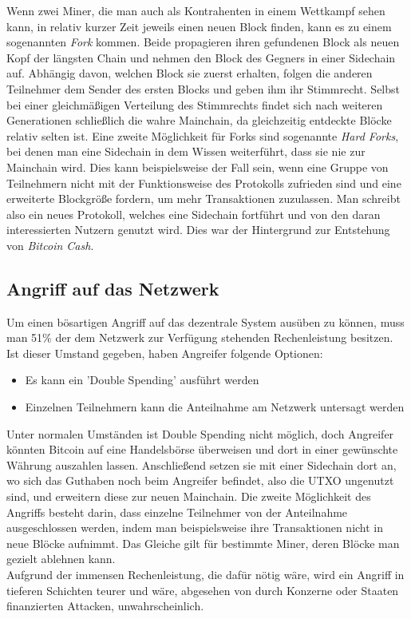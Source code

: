 Wenn zwei Miner, die man auch als Kontrahenten in einem Wettkampf sehen kann, in relativ kurzer Zeit jeweils einen neuen Block finden, kann es zu einem sogenannten \emph{Fork} kommen. 
Beide propagieren ihren gefundenen Block als neuen Kopf der längsten Chain und nehmen den Block des Gegners in einer Sidechain auf. Abhängig davon, welchen Block sie zuerst erhalten, folgen die anderen Teilnehmer dem Sender des ersten Blocks und geben ihm ihr Stimmrecht. 
Selbst bei einer gleichmäßigen Verteilung des Stimmrechts findet sich nach weiteren Generationen schließlich die wahre Mainchain, da gleichzeitig entdeckte Blöcke relativ selten ist.
Eine zweite Möglichkeit für Forks sind sogenannte \emph{Hard Forks}, bei denen man eine Sidechain in dem Wissen weiterführt, dass sie nie zur Mainchain wird. Dies kann beispielsweise der Fall sein, wenn eine Gruppe von Teilnehmern nicht mit der Funktionsweise des Protokolls zufrieden sind und eine erweiterte Blockgröße fordern, um mehr Transaktionen zuzulassen. Man schreibt also ein neues Protokoll, welches eine Sidechain fortführt und von den daran interessierten Nutzern genutzt wird. Dies war der Hintergrund zur Entstehung von \emph{Bitcoin Cash}.
\subsection{Angriff auf das Netzwerk}
Um einen bösartigen Angriff auf das dezentrale System ausüben zu können, muss man 51\% der dem Netzwerk zur Verfügung stehenden Rechenleistung besitzen. Ist dieser Umstand gegeben, haben Angreifer folgende Optionen:
\begin{itemize}
	\item Es kann ein 'Double Spending' ausführt werden
	\item Einzelnen Teilnehmern kann die Anteilnahme am Netzwerk untersagt werden
\end{itemize}
Unter normalen Umständen ist Double Spending nicht möglich, doch Angreifer könnten Bitcoin auf eine Handelsbörse überweisen und dort in einer gewünschte Währung auszahlen lassen. Anschließend setzen sie mit einer Sidechain dort an, wo sich das Guthaben noch beim Angreifer befindet, also die UTXO ungenutzt sind, und erweitern diese zur neuen Mainchain.
Die zweite Möglichkeit des Angriffs besteht darin, dass einzelne Teilnehmer von der Anteilnahme ausgeschlossen werden, indem man beispielsweise ihre Transaktionen nicht in neue Blöcke aufnimmt. Das Gleiche gilt für bestimmte Miner, deren Blöcke man gezielt ablehnen kann.\\

Aufgrund der immensen Rechenleistung, die dafür nötig wäre, wird ein Angriff in tieferen Schichten teurer und wäre, abgesehen von durch Konzerne oder Staaten finanzierten Attacken, unwahrscheinlich.